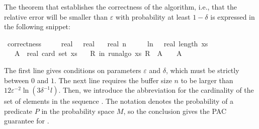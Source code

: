 The theorem that establishes the correctness of the algorithm, i.e., that the relative error will be smaller than $\varepsilon$ with probability at least $1-\delta$ is expressed in the following snippet:
\begin{isabelle_cm}
\isamarkupfalse%
\ correctness{\isacharcolon}{\kern0pt}\isanewline
\ \ \ {\isacartoucheopen}{\isasymepsilon}\ {\isasymin}\ {\isacharbraceleft}{\kern0pt}{}{\isacharless}{\kern0pt}{\isachardot}{\kern0pt}{\isachardot}{\kern0pt}{\isacharless}{\kern0pt}{}{\isacharcolon}{\kern0pt}{\isacharcolon}{\kern0pt}real{\isacharbraceright}{\kern0pt}{\isacartoucheclose}\ {\isacartoucheopen}{\isasymdelta}\ {\isasymin}\ {\isacharbraceleft}{\kern0pt}{}{\isacharless}{\kern0pt}{\isachardot}{\kern0pt}{\isachardot}{\kern0pt}{\isacharless}{\kern0pt}{}{\isacharcolon}{\kern0pt}{\isacharcolon}{\kern0pt}real{\isacharbraceright}{\kern0pt}{\isacartoucheclose}\isanewline
\ \ \ {\isacartoucheopen}real\ n\ {\isasymge}\ {}{}\ {\isacharslash}{\kern0pt}\ {\isasymepsilon}\ {\isacharasterisk}{\kern0pt}\ ln\ {\isacharparenleft}{\kern0pt}{}\ {\isacharasterisk}{\kern0pt}\ real\ {\isacharparenleft}{\kern0pt}length\ xs{\isacharparenright}{\kern0pt}\ {\isacharslash}{\kern0pt}\ {\isasymdelta}{\isacharparenright}{\kern0pt}{\isacartoucheclose}\isanewline
\ \ \ {\isacartoucheopen}A\ {\isasymequiv}\ real\ {\isacharparenleft}{\kern0pt}card\ {\isacharparenleft}{\kern0pt}set\ xs{\isacharparenright}{\kern0pt}{\isacharparenright}{\kern0pt}{\isacartoucheclose}\isanewline
\ \ \ {\isacartoucheopen}{\isasymP}{\isacharparenleft}{\kern0pt}R\ in\ run{\isacharunderscore}{\kern0pt}algo\ xs{\isachardot}{\kern0pt}\ {\isasymbar}R\ {\isacharminus}{\kern0pt}\ A{\isasymbar}\ {\isachargreater}{\kern0pt}\ {\isasymepsilon}\ {\isacharasterisk}{\kern0pt}\ A{\isacharparenright}{\kern0pt}\ {\isasymle}\ {\isasymdelta}{\isacartoucheclose}
\end{isabelle_cm}
The first line gives conditions on parameters $\varepsilon$ and $\delta$, which must be strictly between $0$ and $1$.
The next line requires the buffer size $n$ to be larger than $12 \varepsilon^{-2} \ln ( 3 \delta^{-1} l)$.
Then, we introduce the abbreviation  for the cardinality of the set of elements in the sequence .
The notation  denotes the probability of a predicate $P$ in the probability space $M$, so the conclusion gives the PAC guarantee for .


